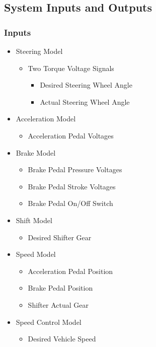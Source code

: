 \documentclass[12pt]{article} %
\begin{document}
\subsection{System Inputs and Outputs}
\subsubsection{Inputs}

\begin{itemize}
    \item Steering Model
    \begin{itemize}
    		\item Two Torque Voltage Signals
    		\begin{itemize}
    			\item Desired Steering Wheel Angle
    			\item Actual Steering Wheel Angle
    		\end{itemize}
    \end{itemize}
    \item Acceleration Model
    \begin{itemize}
    		\item Acceleration Pedal Voltages
    \end{itemize}
    \item Brake Model
    \begin{itemize}
    		\item Brake Pedal Pressure Voltages
    		\item Brake Pedal Stroke Voltages 
    		\item Brake Pedal On/Off Switch
    \end{itemize}
    \item Shift Model
    \begin{itemize}
    		\item Desired Shifter Gear
    \end{itemize}
    \item Speed Model
    \begin{itemize}
    		\item Acceleration Pedal Position
    		\item Brake Pedal Position
    		\item Shifter Actual Gear
    \end{itemize}
    \item Speed Control Model
    \begin{itemize}
    		\item Desired Vehicle Speed
    \end{itemize}
\end{itemize}
\end{document}
